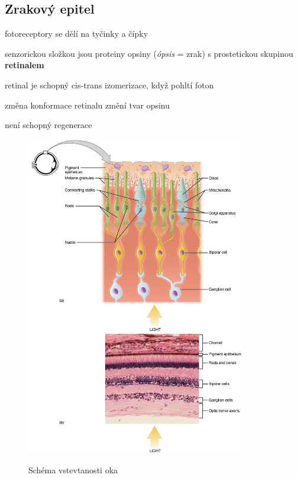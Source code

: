 \documentclass[DIV=8]{scrreprt}
\begin{document}
\subsection{Zrakový epitel} \label{Zrakový epitel}


\begin{myItemize}[nosep]
    \item fotoreceptory se dělí na tyčinky a čípky
    \item senzorickou složkou jsou proteiny opsiny (\emph{ópsis} = zrak) s prostetickou skupinou \textbf{retinalem}
\begin{myItemize}[nosep]
    \item retinal je schopný cis-trans izomerizace, když pohltí foton
    \item změna konformace retinalu změní tvar opsinu
\end{myItemize}

    \item není schopný regenerace
\end{myItemize}



\begin{figure}
    \caption{Schéma vstevtanosti oka}
    \includegraphics[width=0.85\textwidth]{oko.jpg}
    \centering
    \label{}
\end{figure}
\end{document}
